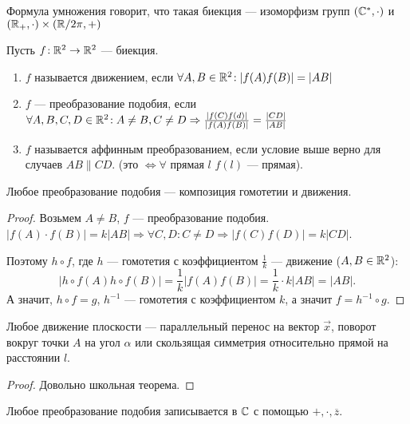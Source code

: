 \begin{remark}
    Формула умножения говорит, что такая биекция --- изоморфизм групп $(\mathbb{C}^*, \cdot)$ и $(\mathbb{R}_+, \cdot) \times (\mathbb{R} / 2\pi, +)$
\end{remark}
\begin{definition}
    Пусть  $f\!: \mathbb{R}^2 \to \mathbb{R}^2$ --- биекция.
    \begin{enumerate}
        \item $f$ называется движением, если $\forall A, B \in \mathbb{R}^2\!: |f(A)f(B)| = |AB|$
        \item $f$ --- преобразование подобия, если  $\forall A, B, C, D \in \mathbb{R}^2\!: A \neq B, C \neq D \Rightarrow \frac{|f(C)f(d)|}{|f(A)f(B)|} = \frac{|CD|}{|AB|}$
        \item $f$ называется аффинным преобразованием, если условие выше верно для случаев  $AB\parallel CD$. (это $\iff \forall$ прямая  $l$  $f(l)$ --- прямая).
    \end{enumerate}
\end{definition}
\begin{statement}
    Любое преобразование подобия --- композиция гомотетии и движения.
\end{statement}
\begin{proof}
    Возьмем $A \neq B$,  $f$ --- преобразование подобия.  $|f(A)\cdot f(B)| = k|AB| \Rightarrow \forall C, D\!: C \neq D \Rightarrow |f(C)f(D)| = k|CD|$.

    Поэтому  $h \circ f$, где  $h$ --- гомотетия с коэффициентом  $\frac{1}{k}$ --- движение ($A, B \in \mathbb{R}^2$): \[
        |h\circ f(A) h \circ f(B)| = \frac{1}{k}|f(A)f(B)| = \frac{1}{k} \cdot k |AB| = |AB|
    .\] 
    А значит, $h \circ f = g$,  $h^{-1}$ --- гомотетия с коэффициентом  $k$, а значит  $f = h^{-1} \circ g$.
\end{proof}
\begin{theorem}
    Любое движение плоскости --- параллельный перенос на вектор $\overrightarrow{x}$, поворот вокруг точки $A$ на угол  $\alpha$ или скользящая симметрия относительно прямой на расстоянии $l$.
\end{theorem}
\begin{proof}
    Довольно школьная теорема.
\end{proof}
\begin{theorem}
    Любое преобразование подобия записывается в $\mathbb{C}$ с помощью  $+, \cdot, \overline{z}$.
\end{theorem}
